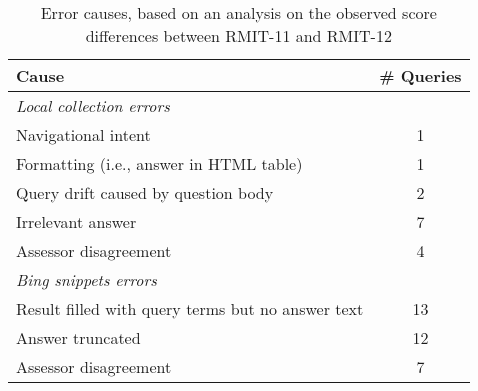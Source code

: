 
\begin{table}
  \centering
  \caption{Error causes, based on an analysis on the observed score differences between RMIT-11 and RMIT-12}
  \label{tbl:analysis}
  \begin{tabular}{lc}
    \toprule
    \bf Cause & \bf \# Queries \\
    \midrule 
    \multicolumn{2}{l}{\it Local collection errors} \\
    \midrule 
    \quad Navigational intent & 1 \\
    \quad Formatting (i.e., answer in HTML table) & 1 \\
    \quad Query drift caused by question body & 2 \\
    \quad Irrelevant answer & 7 \\
    \quad Assessor disagreement & 4 \\
    \midrule
    \multicolumn{2}{l}{\it Bing snippets errors} \\
    \midrule
    \quad Result filled with query terms but no answer text & 13 \\
    \quad Answer truncated & 12 \\
    \quad Assessor disagreement & 7 \\
    \bottomrule
  \end{tabular}
\end{table}
